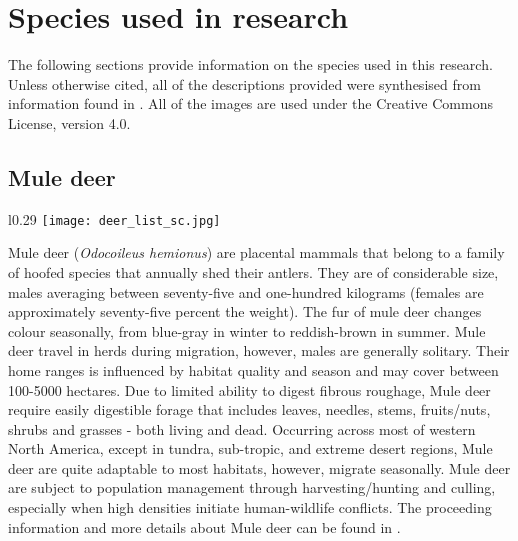 \chapter{Species used in research}\label{apx:B}
\newpage

The following sections provide information on the species used in this research. Unless otherwise cited, all of the descriptions provided were synthesised from information found in \cite{vand08}. All of the images are used under the Creative Commons License, version 4.0.

\section{Mule deer}\label{deer}
\vspace{-0.3cm}
\setlength\intextsep{0pt}
\begin{wrapfigure}{l}{0.29\textwidth}
\centering
\texttt{[image: deer\_list\_sc.jpg]}
\end{wrapfigure}
Mule deer (\textit{Odocoileus hemionus}) are placental mammals that belong to a family of hoofed species that annually shed their antlers. They are of considerable size, males averaging between seventy-five and one-hundred kilograms (females are approximately seventy-five percent the weight). The fur of mule deer changes colour seasonally, from blue-gray in winter to reddish-brown in summer. Mule deer travel in herds during migration, however, males are generally solitary. Their home ranges is influenced by habitat quality and season and may cover between 100-5000 hectares. Due to limited ability to digest fibrous roughage, Mule deer require easily digestible forage that includes leaves, needles, stems, fruits/nuts, shrubs and grasses - both living and dead. Occurring across most of western North America, except in tundra, sub-tropic, and extreme desert regions, Mule deer are quite adaptable to most habitats, however, migrate seasonally. Mule deer are subject to population management through harvesting/hunting and culling, especially when high densities initiate human-wildlife conflicts. The proceeding information and more details about Mule deer can be found in \cite{ferg05}.

